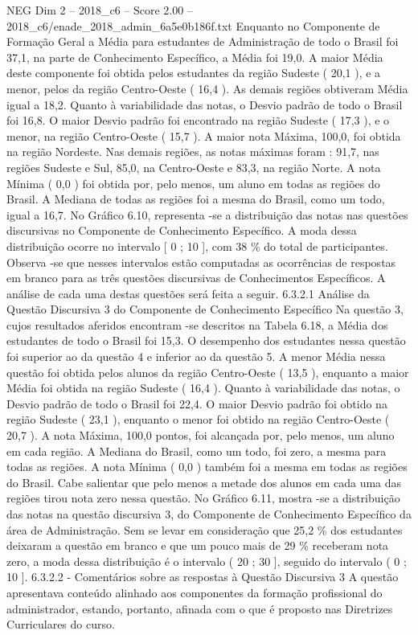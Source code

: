 \begin{textsample}{NEG Dim 2 – 2018\_c6 – Score 2.00 – 2018\_c6/enade\_2018\_admin\_6a5e0b186f.txt}
Enquanto no Componente de Formação Geral a Média para estudantes de Administração de todo o Brasil foi 37,1, na parte de Conhecimento Específico, a Média foi 19,0.
A maior Média deste componente foi obtida pelos estudantes da região Sudeste ( 20,1 ), e a menor, pelos da região Centro-Oeste ( 16,4 ).
As demais regiões obtiveram Média igual a 18,2.
Quanto à variabilidade das notas, o Desvio padrão de todo o Brasil foi 16,8.
O maior Desvio padrão foi encontrado na região Sudeste ( 17,3 ), e o menor, na região Centro-Oeste ( 15,7 ).
A maior nota Máxima, 100,0, foi obtida na região Nordeste.
Nas demais regiões, as notas máximas foram : 91,7, nas regiões Sudeste e Sul, 85,0, na Centro-Oeste e 83,3, na região Norte.
A nota Mínima ( 0,0 ) foi obtida por, pelo menos, um aluno em todas as regiões do Brasil.
A Mediana de todas as regiões foi a mesma do Brasil, como um todo, igual a 16,7.
No Gráfico 6.10, representa -se a distribuição das notas nas questões discursivas no Componente de Conhecimento Específico.
A moda dessa distribuição ocorre no intervalo [ 0 ; 10 ], com 38 \% do total de participantes.
Observa -se que nesses intervalos estão computadas as ocorrências de respostas em branco para as três questões discursivas de Conhecimentos Específicos.
A análise de cada uma destas questões será feita a seguir. 6.3.2.1 Análise da Questão Discursiva 3 do Componente de Conhecimento Específico Na questão 3, cujos resultados aferidos encontram -se descritos na Tabela 6.18, a Média dos estudantes de todo o Brasil foi 15,3.
O desempenho dos estudantes nessa questão foi superior ao da questão 4 e inferior ao da questão 5.
A menor Média nessa questão foi obtida pelos alunos da região Centro-Oeste ( 13,5 ), enquanto a maior Média foi obtida na região Sudeste ( 16,4 ).
Quanto à variabilidade das notas, o Desvio padrão de todo o Brasil foi 22,4.
O maior Desvio padrão foi obtido na região Sudeste ( 23,1 ), enquanto o menor foi obtido na região Centro-Oeste ( 20,7 ).
A nota Máxima, 100,0 pontos, foi alcançada por, pelo menos, um aluno em cada região.
A Mediana do Brasil, como um todo, foi zero, a mesma para todas as regiões.
A nota Mínima ( 0,0 ) também foi a mesma em todas as regiões do Brasil.
Cabe salientar que pelo menos a metade dos alunos em cada uma das regiões tirou nota zero nessa questão.
No Gráfico 6.11, mostra -se a distribuição das notas na questão discursiva 3, do Componente de Conhecimento Específico da área de Administração.
Sem se levar em consideração que 25,2 \% dos estudantes deixaram a questão em branco e que um pouco mais de 29 \% receberam nota zero, a moda dessa distribuição é o intervalo ( 20 ; 30 ], seguido do intervalo ( 0 ; 10 ]. 6.3.2.2 - Comentários sobre as respostas à Questão Discursiva 3 A questão apresentava conteúdo alinhado aos componentes da formação profissional do administrador, estando, portanto, afinada com o que é proposto nas Diretrizes Curriculares do curso.

\end{textsample}
